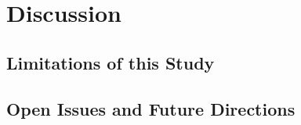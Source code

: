 \section{Discussion\label{sec:sota.discuss}}


\subsection{Limitations of this Study\label{sec:sota.discuss.limits}}

\subsection{Open Issues and Future Directions\label{sec:sota.discuss.open}}

